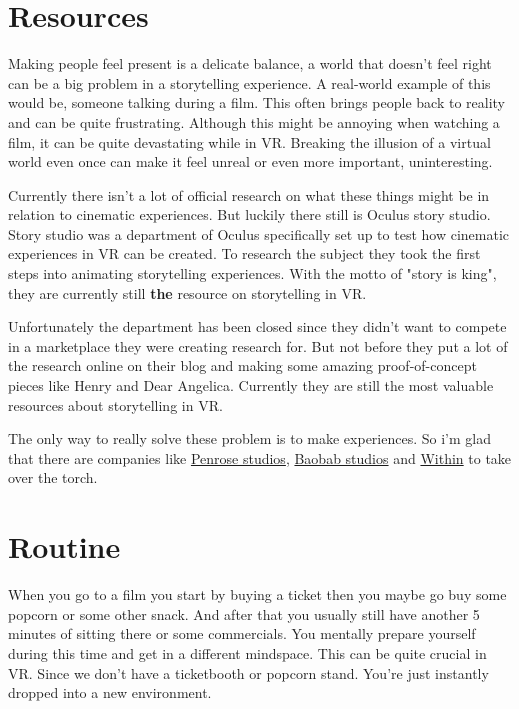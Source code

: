\documentclass{report}
\begin{document}
				\section{Resources}	
				Making people feel present is a delicate balance, a world that doesn't feel right can be a big problem in a storytelling experience. A real-world example of this would be, someone talking during a film. This often brings people back to reality and can be quite frustrating. Although this might be annoying when watching a film, it can be quite devastating while in VR. Breaking the illusion of a virtual world even once can make it feel unreal or even more important, uninteresting.

				Currently there isn't a lot of official research on what these things might be in relation to cinematic experiences. But luckily there still is Oculus story studio. Story studio was a department of Oculus specifically set up to test how cinematic experiences in VR can be created. To research the subject they took the first steps into animating storytelling experiences. With the motto of "story is king", they are currently still \textbf{the} resource on storytelling in VR. 
				
				Unfortunately the department has been closed since they didn't want to compete in a marketplace they were creating research for. But not before they put a lot of the research online on their blog and making some amazing proof-of-concept pieces like Henry and Dear Angelica. Currently they are still the most valuable resources about storytelling in VR.
				
				The only way to really solve these problem is to make experiences. So i'm glad that there are companies like \href{http://www.penrosestudios.com/}{Penrose studios}, \href{http://www.baobabstudios.com/}{Baobab studios} and \href{https://with.in/}{Within} to take over the torch.

				\section{Routine}\label{chap:Routine}
				
				When you go to a film you start by buying a ticket then you maybe go buy some popcorn or some other snack. And after that you usually still have another 5 minutes of sitting there or some commercials. You mentally prepare yourself during this time and get in a different mindspace. This can be quite crucial in VR. Since we don't have a ticketbooth or popcorn stand. You're just instantly dropped into a new environment. 
				
\end{document}
